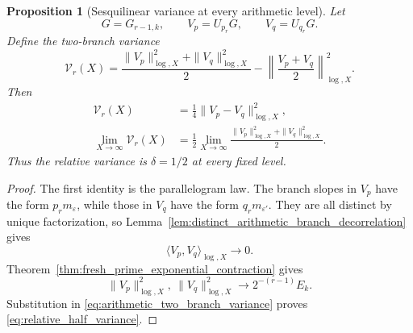 \documentclass[11pt]{amsart}
\numberwithin{equation}{section}
\theoremstyle{plain}
\newtheorem{proposition}[theorem]{Proposition}
\theoremstyle{definition}
\theoremstyle{remark}
\begin{document}
\begin{proposition}[Sesquilinear variance at every arithmetic level]
\label{prop:fresh_prime_sesquilinear_variance}
Let
\begin{equation}
G=G_{r-1,k},
\qquad
V_p=U_{p_r}G,
\qquad
V_q=U_{q_r}G.
\label{eq:new_branch_families}
\end{equation}
Define the two-branch variance
\begin{equation}
\mathcal V_r(X)
=
\frac{\|V_p\|_{\log,X}^2+\|V_q\|_{\log,X}^2}{2}
-
\left\|\frac{V_p+V_q}{2}\right\|_{\log,X}^2.
\label{eq:arithmetic_two_branch_variance}
\end{equation}
Then
\begin{align}
\mathcal V_r(X)
&=
\frac14\|V_p-V_q\|_{\log,X}^2,
\label{eq:arithmetic_variance_difference_form}
\\
\lim_{X\to\infty}\mathcal V_r(X)
&=
\frac12
\lim_{X\to\infty}
\frac{\|V_p\|_{\log,X}^2+\|V_q\|_{\log,X}^2}{2}.
\label{eq:relative_half_variance}
\end{align}
Thus the relative variance is $\delta=1/2$ at every fixed level.
\end{proposition}

\begin{proof}
The first identity is the parallelogram law.  The branch slopes in $V_p$ have the form $p_rm_\varepsilon$, while those in $V_q$ have the form $q_rm_{\varepsilon'}$.  They are all distinct by unique factorization, so Lemma~\ref{lem:distinct_arithmetic_branch_decorrelation} gives
\begin{equation}
\langle V_p,V_q\rangle_{\log,X}\longrightarrow0.
\label{eq:new_branch_family_orthogonality}
\end{equation}
Theorem~\ref{thm:fresh_prime_exponential_contraction} gives
\begin{equation}
\|V_p\|_{\log,X}^2,
\ \|V_q\|_{\log,X}^2
\longrightarrow
2^{-(r-1)}E_k.
\label{eq:new_branch_family_energies}
\end{equation}
Substitution in \eqref{eq:arithmetic_two_branch_variance} proves \eqref{eq:relative_half_variance}.
\end{proof}
\end{document}

